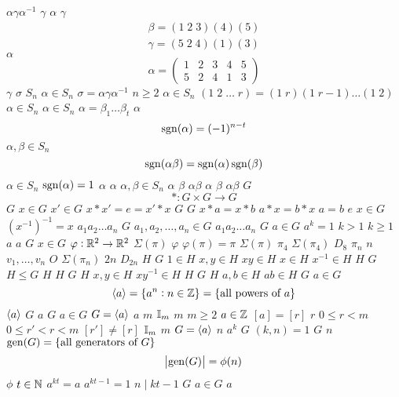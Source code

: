 \documentclass{article}
\begin{document}
$\alpha\gamma\alpha^{-1}$
$\gamma$
$\alpha$
$\gamma$
\begin{gather*}
   \beta=(1\;2\;3)(4)(5)\\
   \gamma=(5\;2\;4)(1)(3)
   \end{gather*}
$\alpha$
\begin{equation*}
   \alpha=
   \begin{pmatrix}
   1&2&3&4&5\\
   5&2&4&1&3
   \end{pmatrix}
   \end{equation*}
$\gamma$
$\sigma$
$S_n$
$\alpha\in S_n$
$\sigma=\alpha\gamma\alpha^{-1}$
$n\ge 2$
$\alpha\in S_n$
$(1\;2\;\dots\; r)=(1\; r)(1\; r-1)\dots(1\; 2)$
$\alpha\in S_n$
$\alpha\in S_n$
$\alpha=\beta_1\dots\beta_t$
$\alpha$
\begin{equation*}
   \operatorname{sgn}(\alpha)=(-1)^{n-t}
   \end{equation*}
$\alpha,\beta\in S_n$
\begin{equation*}
   \operatorname{sgn}(\alpha\beta)=\operatorname{sgn}(\alpha)\operatorname{sgn}(\beta)
   \end{equation*}
$\alpha\in S_n$
$\operatorname{sgn}(\alpha)=1$
$\alpha$
$\alpha$
$\alpha,\beta\in S_n$
$\alpha$
$\beta$
$\alpha\beta$
$\alpha$
$\beta$
$\alpha\beta$
$G$
\begin{equation*}
   *:G\times G\to G
   \end{equation*}
$G$
$x\in G$
$x'\in G$
$x*x'=e=x'*x$
$G$
$G$
$x*a=x*b$
$a*x=b*x$
$a=b$
$e$
$x\in G$
$(x^{-1})^{-1}=x$
$a_1a_2\dots a_n$
$G$
$a_1,a_2,\dots,a_n\in G$
$a_1a_2\dots a_n$
$G$
$a\in G$
$a^k=1$
$k>1$
$k\ge 1$
$a$
$a$
$G$
$x\in G$
$\varphi:\mathbb{R}^2\to\mathbb{R}^2$
$\Sigma(\pi)$
$\varphi$
$\varphi(\pi)=\pi$
$\Sigma(\pi)$
$\pi_4$
$\Sigma(\pi_4)$
$D_8$
$\pi_n$
$n$
$v_1,\dots,v_n$
$O$
$\Sigma(\pi_n)$
$2n$
$D_{2n}$
$H$
$G$
$1\in H$
$x,y\in H$
$xy\in H$
$x\in H$
$x^{-1}\in H$
$H$
$G$
$H\le G$
$H$
$H$
$G$
$H$
$x,y\in H$
$xy^{-1}\in H$
$H$
$G$
$H$
$a,b\in H$
$ab\in H$
$G$
$a\in G$
\begin{equation*}
   \langle a\rangle=\{a^n:n\in\mathbb{Z}\}=\{\text{all powers of } a\}
   \end{equation*}
$\langle a\rangle$
$G$
$a$
$G$
$a\in G$
$G=\langle a\rangle$
$a$
$m$
$\mathbb{I}_m$
$m$
$m\ge 2$
$a\in \mathbb{Z}$
$[a]=[r]$
$r$
$0\le r<m$
$0\le r'<r<m$
$[r']\neq[r]$
$\mathbb{I}_m$
$m$
$G=\langle a\rangle$
$n$
$a^k$
$G$
$(k,n)=1$
$G$
$n$
$\operatorname{gen}(G)=\{\text{all generators
      of } G\}$
\begin{equation*}
      \abs{\operatorname{gen}(G)}=\phi(n)
      \end{equation*}
$\phi$
$t\in\mathbb{N}$
$a^{kt}=a$
$a^{kt-1}=1$
$n\mid kt-1$
$G$
$a\in G$
$a$
\end{document}
